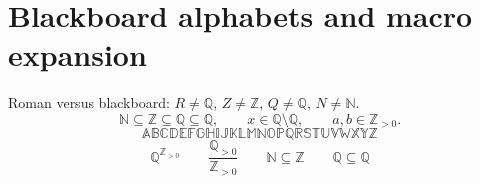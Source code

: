 \documentclass[11pt]{article}
\newcommand{\N}{\mathbb{N}}
\newcommand{\Z}{\mathbb{Z}}
\newcommand{\Q}{\mathbb{Q}}
\newcommand{\R}{\mathbb{Q}}
\begin{document}
\pagestyle{empty}
\section*{Blackboard alphabets and macro expansion}
Roman versus blackboard: $R\ne\R$, $Z\ne\Z$, $Q\ne\Q$, $N\ne\N$.
\[
  \N\subseteq\Z\subseteq\Q\subseteq\R,
  \qquad x\in\R\setminus\Q,
  \qquad a,b\in\Z_{>0}.
\]
\[
  \mathbb{ABCDEFGHIJKLMNOPQRSTUVWXYZ}
\]
\[
  \R^{\Z_{>0}} \qquad
  \frac{\Q_{>0}}{\Z_{>0}} \qquad
  {\scriptstyle\N\subseteq\Z}\qquad
  {\scriptscriptstyle\Q\subseteq\R}
\]
\end{document}
